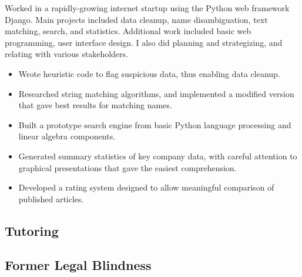 \documentclass[11pt,a4paper,sans]{moderncv} %
\begin{document}
{Worked in a rapidly-growing internet startup using the Python web framework Django.  Main projects included data cleanup, name disambiguation, text matching, search, and statistics.  Additional work included basic web programming, user interface design.  I also did planning and strategizing, and relating with various stakeholders.
\begin{itemize}
	\item Wrote heuristic code to flag suspicious data, thus enabling data cleanup.
	\item Researched string matching algorithms, and implemented a modified version that gave best results for matching names.
	\item Built a prototype search engine from basic Python language processing and linear algebra components.
	\item Generated summary statistics of key company data, with careful attention to graphical presentations that gave the easiest comprehension.
	\item Developed a rating system designed to allow meaningful comparison of published articles.
\end{itemize}
}


\subsection{Tutoring}

\subsection{Former Legal Blindness}
\end{document}
